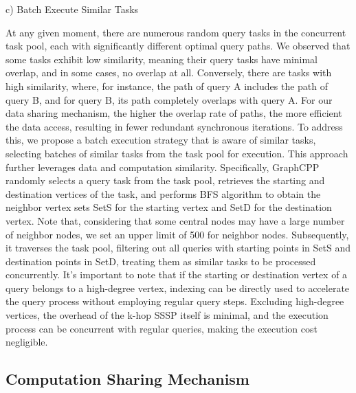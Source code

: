 \documentclass[lettersize,journal]{IEEEtran} %
\begin{document}
c) Batch Execute Similar Tasks

At any given moment, there are numerous random query tasks in the concurrent task pool, each with significantly different optimal query paths. We observed that some tasks exhibit low similarity, meaning their query tasks have minimal overlap, and in some cases, no overlap at all. Conversely, there are tasks with high similarity, where, for instance, the path of query A includes the path of query B, and for query B, its path completely overlaps with query A. For our data sharing mechanism, the higher the overlap rate of paths, the more efficient the data access, resulting in fewer redundant synchronous iterations. To address this, we propose a batch execution strategy that is aware of similar tasks, selecting batches of similar tasks from the task pool for execution. This approach further leverages data and computation similarity. Specifically, GraphCPP randomly selects a query task from the task pool, retrieves the starting and destination vertices of the task, and performs BFS algorithm to obtain the neighbor vertex sets SetS for the starting vertex and SetD for the destination vertex. Note that, considering that some central nodes may have a large number of neighbor nodes, we set an upper limit of 500 for neighbor nodes. Subsequently, it traverses the task pool, filtering out all queries with starting points in SetS and destination points in SetD, treating them as similar tasks to be processed concurrently. It's important to note that if the starting or destination vertex of a query belongs to a high-degree vertex, indexing can be directly used to accelerate the query process without employing regular query steps. Excluding high-degree vertices, the overhead of the k-hop SSSP itself is minimal, and the execution process can be concurrent with regular queries, making the execution cost negligible.


\subsection{Computation Sharing Mechanism}
\end{document}
